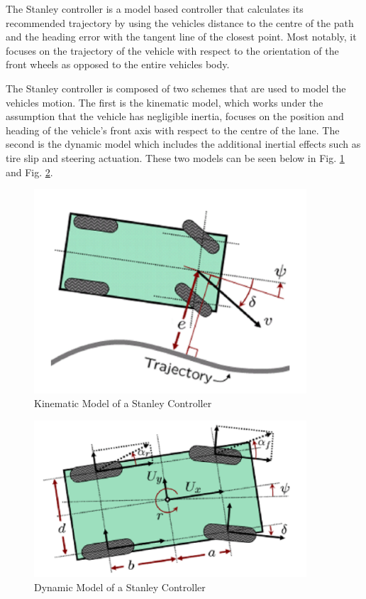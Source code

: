 \documentclass[titlepage,draft]{article}
\begin{document}
{The Stanley controller is a model based controller that calculates its recommended trajectory by using the vehicles distance to the centre of the path and the heading error with the tangent line of the closest point. Most notably, it focuses on the trajectory of the vehicle with respect to the orientation of the front wheels as opposed to the entire vehicles body\cite{4282788}.

The Stanley controller is composed of two schemes that are used to model the vehicles motion. The first is the kinematic model, which works under the assumption that the vehicle has negligible inertia, focuses on the position and heading of the vehicle's front axis with respect to the centre of the lane. The second is the dynamic model which includes the additional inertial effects such as tire slip and steering actuation. These two models can be seen below in Fig. \ref{fig:stankine} and Fig. \ref{fig:standyna}.

\begin{figure}
	\centering
	\includegraphics[width=4in]{stanley_kinematic}
	\caption{Kinematic Model of a Stanley Controller\cite{4282788}}
	\label{fig:stankine}
\end{figure}

\begin{figure}
	\centering
	\includegraphics[width=4in]{stanley_dynamic}
	\caption{Dynamic Model of a Stanley Controller\cite{4282788}}
	\label{fig:standyna}
\end{figure}

}
\end{document}
